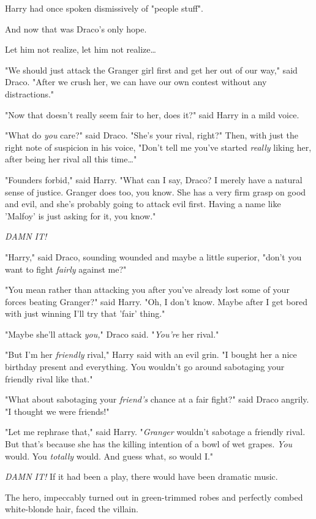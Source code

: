 Harry had once spoken dismissively of "people stuff".

And now that was Draco's only hope.

Let him not realize, let him not realize{\ldots}

"We should just attack the Granger girl first and get her out of our way," said 
Draco. "After we crush her, we can have our own contest without any 
distractions."

"Now that doesn't really seem fair to her, does it?" said Harry in a mild voice.

"What do \emph{you} care?" said Draco. "She's your rival, right?" Then, with 
just the right note of suspicion in his voice, "Don't tell me you've started 
\emph{really} liking her, after being her rival all this time{\ldots}"

"Founders forbid," said Harry. "What can I say, Draco? I merely have a natural 
sense of justice. Granger does too, you know. She has a very firm grasp on good 
and evil, and she's probably going to attack evil first. Having a name like 
'Malfoy' is just asking for it, you know."

\emph{DAMN IT!}

"Harry," said Draco, sounding wounded and maybe a little superior, "don't you 
want to fight \emph{fairly} against me?"

"You mean rather than attacking you after you've already lost some of your 
forces beating Granger?" said Harry. "Oh, I don't know. Maybe after I get bored 
with just winning I'll try that 'fair' thing."

"Maybe she'll attack \emph{you,}" Draco said. "\emph{You're} her rival."

"But I'm her \emph{friendly} rival," Harry said with an evil grin. "I bought 
her a nice birthday present and everything. You wouldn't go around sabotaging 
your friendly rival like that."

"What about sabotaging your \emph{friend's} chance at a fair fight?" said Draco 
angrily. "I thought we were friends!"

"Let me rephrase that," said Harry. "\emph{Granger} wouldn't sabotage a 
friendly rival. But that's because she has the killing intention of a bowl of 
wet grapes. \emph{You} would. You \emph{totally} would. And guess what, so 
would I."

\emph{DAMN IT!}
\sbreak
If it had been a play, there would have been dramatic music.

The hero, impeccably turned out in green-trimmed robes and perfectly combed 
white-blonde hair, faced the villain.

